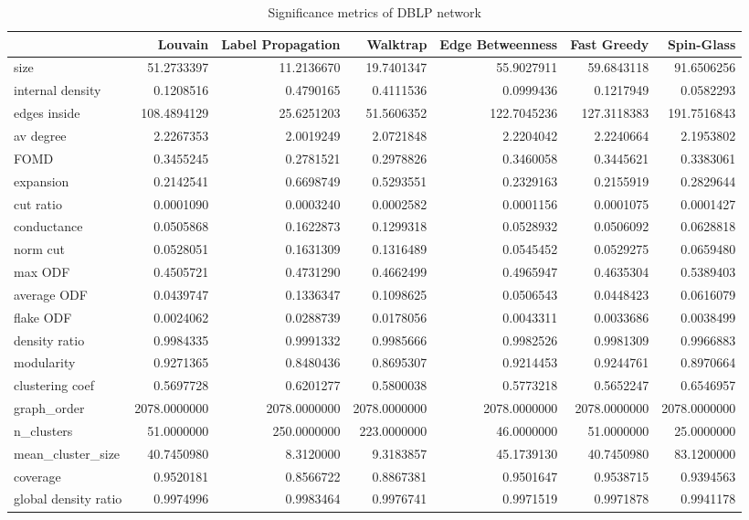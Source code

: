 \begin{table}[ht]
\centering
\begin{tabular}{lrrrrrr}
  \hline
 & Louvain & Label Propagation & Walktrap & Edge Betweenness & Fast Greedy & Spin-Glass \\ 
  \hline
size & 51.2733397 & 11.2136670 & 19.7401347 & 55.9027911 & 59.6843118 & 91.6506256 \\ 
  internal density & 0.1208516 & 0.4790165 & 0.4111536 & 0.0999436 & 0.1217949 & 0.0582293 \\ 
  edges inside & 108.4894129 & 25.6251203 & 51.5606352 & 122.7045236 & 127.3118383 & 191.7516843 \\ 
  av degree & 2.2267353 & 2.0019249 & 2.0721848 & 2.2204042 & 2.2240664 & 2.1953802 \\ 
  FOMD & 0.3455245 & 0.2781521 & 0.2978826 & 0.3460058 & 0.3445621 & 0.3383061 \\ 
  expansion & 0.2142541 & 0.6698749 & 0.5293551 & 0.2329163 & 0.2155919 & 0.2829644 \\ 
  cut ratio & 0.0001090 & 0.0003240 & 0.0002582 & 0.0001156 & 0.0001075 & 0.0001427 \\ 
  conductance & 0.0505868 & 0.1622873 & 0.1299318 & 0.0528932 & 0.0506092 & 0.0628818 \\ 
  norm cut & 0.0528051 & 0.1631309 & 0.1316489 & 0.0545452 & 0.0529275 & 0.0659480 \\ 
  max ODF & 0.4505721 & 0.4731290 & 0.4662499 & 0.4965947 & 0.4635304 & 0.5389403 \\ 
  average ODF & 0.0439747 & 0.1336347 & 0.1098625 & 0.0506543 & 0.0448423 & 0.0616079 \\ 
  flake ODF & 0.0024062 & 0.0288739 & 0.0178056 & 0.0043311 & 0.0033686 & 0.0038499 \\ 
  density ratio & 0.9984335 & 0.9991332 & 0.9985666 & 0.9982526 & 0.9981309 & 0.9966883 \\ 
  modularity & 0.9271365 & 0.8480436 & 0.8695307 & 0.9214453 & 0.9244761 & 0.8970664 \\ 
  clustering coef & 0.5697728 & 0.6201277 & 0.5800038 & 0.5773218 & 0.5652247 & 0.6546957 \\ 
  graph\_order & 2078.0000000 & 2078.0000000 & 2078.0000000 & 2078.0000000 & 2078.0000000 & 2078.0000000 \\ 
  n\_clusters & 51.0000000 & 250.0000000 & 223.0000000 & 46.0000000 & 51.0000000 & 25.0000000 \\ 
  mean\_cluster\_size & 40.7450980 & 8.3120000 & 9.3183857 & 45.1739130 & 40.7450980 & 83.1200000 \\ 
  coverage & 0.9520181 & 0.8566722 & 0.8867381 & 0.9501647 & 0.9538715 & 0.9394563 \\ 
  global density ratio & 0.9974996 & 0.9983464 & 0.9976741 & 0.9971519 & 0.9971878 & 0.9941178 \\ 
   \hline
\end{tabular}

\caption{Significance metrics of DBLP network}
\label{tab:sig_dblp}
\end{table}
